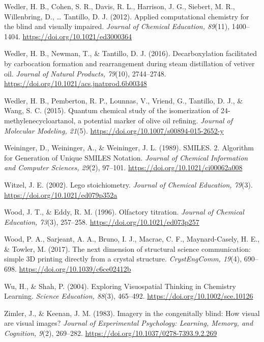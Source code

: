 \documentclass[11.5pt]{sig-alternate} %
\begin{document}
Wedler, H. B., Cohen, S. R., Davis, R. L., Harrison, J. G., Siebert, M. R., Willenbring, D., … Tantillo, D. J. (2012). Applied computational chemistry for the blind and visually impaired. \textit{Journal of Chemical Education, 89}(11), 1400–1404. \url{https://doi.org/10.1021/ed3000364}

Wedler, H. B., Newman, T., \& Tantillo, D. J. (2016). Decarboxylation facilitated by carbocation formation and rearrangement during steam distillation of vetiver oil. \textit{Journal of Natural Products, 79}(10), 2744–2748. \url{https://doi.org/10.1021/acs.jnatprod.6b00348}

Wedler, H. B., Pemberton, R. P., Lounnas, V., Vriend, G., Tantillo, D. J., \& Wang, S. C. (2015). Quantum chemical study of the isomerization of 24-methylenecycloartanol, a potential marker of olive oil refining. \textit{Journal of Molecular Modeling, 21}(5). \url{https://doi.org/10.1007/s00894-015-2652-y}

Weininger, D., Weininger, A., \& Weininger, J. L. (1989). SMILES. 2. Algorithm for Generation of Unique SMILES Notation. \textit{Journal of Chemical Information and Computer Sciences, 29}(2), 97–101. \url{https://doi.org/10.1021/ci00062a008}

Witzel, J. E. (2002). Lego stoichiometry. \textit{Journal of Chemical Education, 79}(3). \url{https://doi.org/10.1021/ed079p352a}

Wood, J. T., \& Eddy, R. M. (1996). Olfactory titration. \textit{Journal of Chemical Education, 73}(3), 257–258. \url{https://doi.org/10.1021/ed073p257}

Wood, P. A., Sarjeant, A. A., Bruno, I. J., Macrae, C. F., Maynard-Casely, H. E., \& Towler, M. (2017). The next dimension of structural science communication: simple 3D printing directly from a crystal structure. \textit{CrystEngComm, 19}(4), 690–698. \url{https://doi.org/10.1039/c6ce02412b}

Wu, H., \& Shah, P. (2004). Exploring Visuospatial Thinking in Chemistry Learning. \textit{Science Education, 88}(3), 465–492. \url{https://doi.org/10.1002/sce.10126}

Zimler, J., \& Keenan, J. M. (1983). Imagery in the congenitally blind: How visual are visual images? \textit{Journal of Experimental Psychology: Learning, Memory, and Cognition, 9}(2), 269–282. \url{https://doi.org/10.1037/0278-7393.9.2.269}
\end{document}
